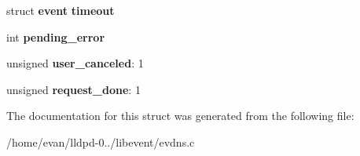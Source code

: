 \begin{DoxyCompactItemize}
\item 
struct {\bf event} {\bfseries timeout}\label{structevdns__getaddrinfo__request_a6b8b4cba434a6a60428b188f163474fc}

\item 
int {\bfseries pending\-\_\-error}\label{structevdns__getaddrinfo__request_ae70d163948595a40b7034e40ef93cd31}

\item 
unsigned {\bfseries user\-\_\-canceled}\-: 1\label{structevdns__getaddrinfo__request_a36044a0803b4edbd7ec9042e64e46481}

\item 
unsigned {\bfseries request\-\_\-done}\-: 1\label{structevdns__getaddrinfo__request_a2f18ed2741e56674e47ce56e04c3c355}

\end{DoxyCompactItemize}


\-The documentation for this struct was generated from the following file\-:\begin{DoxyCompactItemize}
\item 
/home/evan/lldpd-\/0../libevent/evdns.\-c\end{DoxyCompactItemize}
